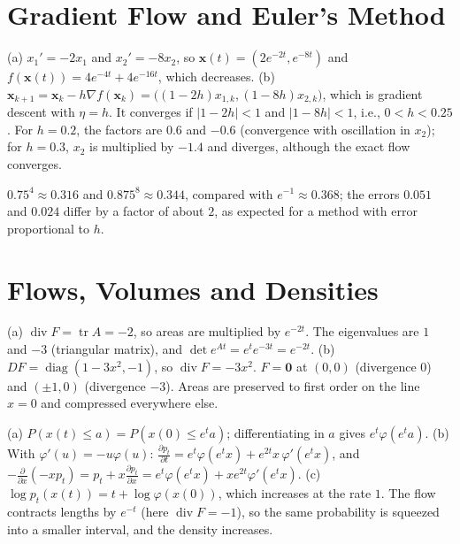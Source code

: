 \documentclass[11pt]{article}
\DeclareMathOperator{\diag}{diag}
\DeclareMathOperator{\tr}{tr}
\DeclareMathOperator{\Div}{div}
\begin{document}
\section*{Gradient Flow and Euler's Method}

\begin{description}[leftmargin=0pt, itemsep=0.3em]
    \item[\ref{pr:gradient-flow}.] (a) $x_1' = -2x_1$ and $x_2' = -8x_2$, so $\mathbf{x}(t) = (2e^{-2t}, e^{-8t})$ and $f(\mathbf{x}(t)) = 4e^{-4t} + 4e^{-16t}$, which decreases. (b) $\mathbf{x}_{k+1} = \mathbf{x}_k - h\nabla f(\mathbf{x}_k) = \big((1 - 2h)x_{1,k}, (1 - 8h)x_{2,k}\big)$, which is gradient descent with $\eta = h$. It converges if $|1 - 2h| < 1$ and $|1 - 8h| < 1$, i.e., $0 < h < 0.25$. For $h = 0.2$, the factors are $0.6$ and $-0.6$ (convergence with oscillation in $x_2$); for $h = 0.3$, $x_2$ is multiplied by $-1.4$ and diverges, although the exact flow converges.
    \item[\ref{pr:euler-error}.] $0.75^4 \approx 0.316$ and $0.875^8 \approx 0.344$, compared with $e^{-1} \approx 0.368$; the errors $0.051$ and $0.024$ differ by a factor of about $2$, as expected for a method with error proportional to $h$.
\end{description}

\section*{Flows, Volumes and Densities}

\begin{description}[leftmargin=0pt, itemsep=0.3em]
    \item[\ref{pr:volume-flow}.] (a) $\Div F = \tr A = -2$, so areas are multiplied by $e^{-2t}$. The eigenvalues are $1$ and $-3$ (triangular matrix), and $\det e^{At} = e^te^{-3t} = e^{-2t}$. (b) $DF = \diag(1 - 3x^2, -1)$, so $\Div F = -3x^2$. $F = \mathbf{0}$ at $(0, 0)$ (divergence $0$) and $(\pm 1, 0)$ (divergence $-3$). Areas are preserved to first order on the line $x = 0$ and compressed everywhere else.
    \item[\ref{pr:continuity-1d}.] (a) $P(x(t) \leq a) = P(x(0) \leq e^ta)$; differentiating in $a$ gives $e^t\varphi(e^ta)$. (b) With $\varphi'(u) = -u\varphi(u)$: $\frac{\partial p_t}{\partial t} = e^t\varphi(e^tx) + e^{2t}x\,\varphi'(e^tx)$, and $-\frac{\partial}{\partial x}(-xp_t) = p_t + x\frac{\partial p_t}{\partial x} = e^t\varphi(e^tx) + xe^{2t}\varphi'(e^tx)$. (c) $\log p_t(x(t)) = t + \log\varphi(x(0))$, which increases at the rate $1$. The flow contracts lengths by $e^{-t}$ (here $\Div F = -1$), so the same probability is squeezed into a smaller interval, and the density increases.
\end{description}
\end{document}
